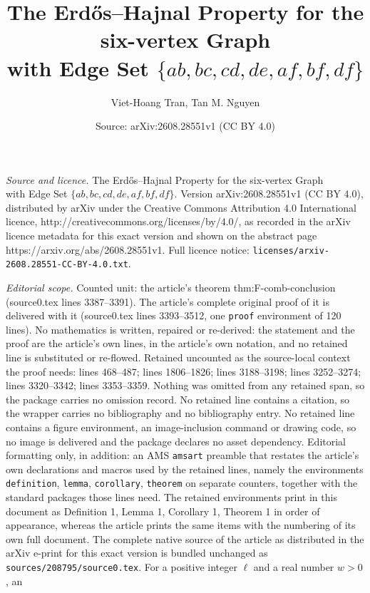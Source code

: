\documentclass[10pt,a4paper]{amsart}
\title{The Erd\H{o}s--Hajnal Property for the six-vertex Graph\\ with Edge Set $\{ab,bc,cd,de,af,bf,df\}$}
\author{Viet-Hoang Tran, Tan M. Nguyen}
\date{Source: arXiv:2608.28551v1 (CC BY 4.0)}
\begin{document}
\maketitle

\noindent\emph{Source and licence.} The Erd\H{o}s--Hajnal Property for the six-vertex Graph\\ with Edge Set $\{ab,bc,cd,de,af,bf,df\}$. Version arXiv:2608.28551v1 (CC BY 4.0), distributed by arXiv under the Creative Commons Attribution 4.0 International licence, http://creativecommons.org/licenses/by/4.0/, as recorded in the arXiv licence metadata for this exact version and shown on the abstract page https://arxiv.org/abs/2608.28551v1. Full licence notice: \texttt{licenses/arxiv-2608.28551-CC-BY-4.0.txt}.\par\smallskip

\noindent\textit{Editorial scope.} Counted unit: the article's theorem thm:F-comb-conclusion (source0.tex lines 3387--3391). The article's complete original proof of it is delivered with it (source0.tex lines 3393--3512, one \texttt{proof} environment of 120 lines). No mathematics is written, repaired or re-derived: the statement and the proof are the article's own lines, in the article's own notation, and no retained line is substituted or re-flowed.  Retained uncounted as the source-local context the proof needs: lines 468--487; lines 1806--1826; lines 3188--3198; lines 3252--3274; lines 3320--3342; lines 3353--3359.  Nothing was omitted from any retained span, so the package carries no omission record.  No retained line contains a citation, so the wrapper carries no bibliography and no bibliography entry.  No retained line contains a figure environment, an image-inclusion command or drawing code, so no image is delivered and the package declares no asset dependency.  Editorial formatting only, in addition: an AMS \texttt{amsart} preamble that restates the article's own declarations and macros used by the retained lines, namely the environments \texttt{definition}, \texttt{lemma}, \texttt{corollary}, \texttt{theorem} on separate counters, together with the standard packages those lines need.  The retained environments print in this document as Definition 1, Lemma 1, Corollary 1, Theorem 1 in order of appearance, whereas the article prints the same items with the numbering of its own full document.  The complete native source of the article as distributed in the arXiv e-print for this exact version is bundled unchanged as \texttt{sources/208795/source0.tex}.
For a positive integer $\ell$ and a real number $w>0$, an
\end{document}
